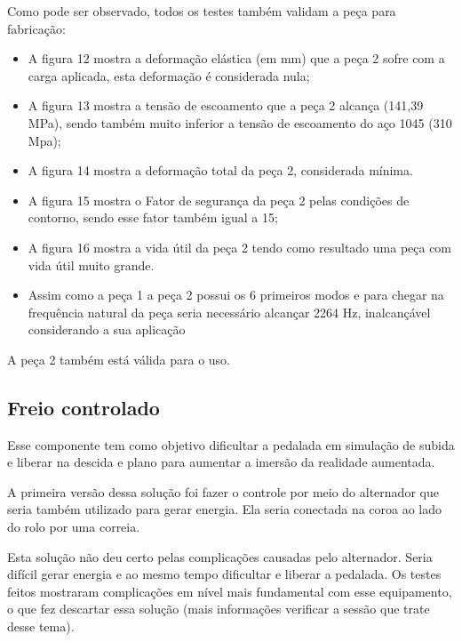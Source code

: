  
 
    Como pode ser observado, todos os testes também validam a peça para fabricação:
 
    \begin{itemize}
        \item A figura 12 mostra a deformação elástica (em mm) que a peça 2 sofre com a carga aplicada, esta deformação é considerada nula;
        \item A figura 13 mostra a tensão de escoamento que a peça 2 alcança (141,39 MPa), sendo também muito inferior a tensão de escoamento do aço 1045 (310 Mpa);
        \item A figura 14 mostra a deformação total da peça 2, considerada mínima.
        \item A figura 15 mostra o Fator de segurança da peça 2 pelas condições de contorno, sendo esse fator também igual a 15;
        \item A figura 16 mostra a vida útil da peça 2 tendo como resultado uma peça com vida útil muito grande.
        \item Assim como a peça 1 a peça 2 possui os 6 primeiros modos e para chegar na frequência natural da peça seria necessário alcançar 2264 Hz, inalcançável considerando a sua aplicação
    \end{itemize}

A peça 2 também está válida para o uso.

\subsection{Freio controlado} 
    Esse componente tem como objetivo dificultar a pedalada em simulação de subida e liberar na descida e plano para aumentar a imersão da realidade aumentada.

    A primeira versão dessa solução foi fazer o controle por meio do alternador que seria também utilizado para gerar energia. Ela seria conectada na coroa ao lado do rolo por uma correia.

    Esta solução não deu certo pelas complicações causadas pelo alternador. Seria difícil gerar energia e ao mesmo tempo dificultar e liberar a pedalada. Os testes feitos mostraram complicações em nível mais fundamental com esse equipamento, o que fez descartar essa solução (mais informações verificar a sessão que trate desse tema).

